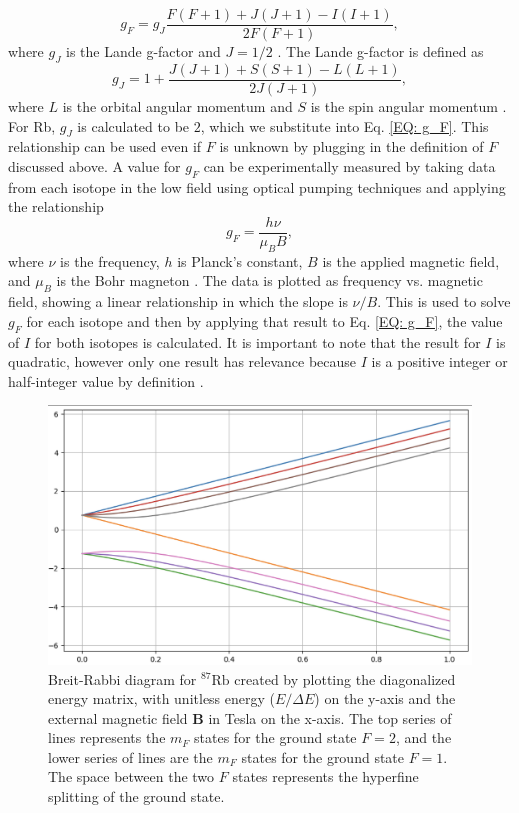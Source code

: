 \documentclass[
 reprint,
linenumbers,
aps,amsmath
]{revtex4-2}
\begin{document}
\begin{equation}
 g_F = g_J \frac{F(F+1) + J(J+1) - I(I+1)}{2F(F+1)},
 \label{EQ: g_F}
\end{equation}
where $g_J$ is the Lande g-factor and $J=1/2$ \cite{McIntyre-QM_Zeeman}. The Lande g-factor is defined as
\begin{equation}
    g_J=1+\frac{J(J+1)+S(S+1)-L(L+1)}{2J(J+1)},
\end{equation}
where $L$ is the orbital angular momentum and $S$ is the spin angular momentum \cite{McIntyre-QM_Zeeman}. For Rb, $g_J$ is calculated to be $2$, which we substitute into Eq. \ref{EQ: g_F}. This relationship can be used even if $F$ is unknown by plugging in the definition of $F$ discussed above. A value for $g_F$ can be experimentally measured by taking data from each isotope in the low field using optical pumping techniques and applying the relationship
\begin{equation}
    g_F=\frac{h\nu}{\mu_BB},
\end{equation}
where $\nu$ is the frequency, $h$ is Planck's constant, $B$ is the applied magnetic field, and $\mu_B$ is the Bohr magneton \cite{melissinos-mod-phys}. The data is plotted as frequency vs. magnetic field, showing a linear relationship in which the slope is $\nu/B$. This is used to solve $g_F$ for each isotope and then by applying that result to Eq. \ref{EQ: g_F}, the value of $I$ for both isotopes is calculated. It is important to note that the result for $I$ is quadratic, however only one result has relevance because $I$ is a positive integer or half-integer value by definition \cite{McIntyre-QM}.
\begin{figure} [h]
    \centering
    \includegraphics[width=1 \linewidth]{Images/Rb 87 BRD 3.png}
    \caption{Breit-Rabbi diagram for $^{87}\mathrm{Rb}$ created by plotting the diagonalized energy matrix, with unitless energy ($E/\Delta E$) on the y-axis and the external magnetic field $\mathbf{B}$ in Tesla on the x-axis. The top series of lines represents the $m_F$ states for the ground state $F=2$, and the lower series of lines are the $m_F$ states for the ground state $F=1$. The space between the two $F$ states represents the hyperfine splitting of the ground state.}
    \label{Rb 87 BRD}
\end{figure}
\end{document}
